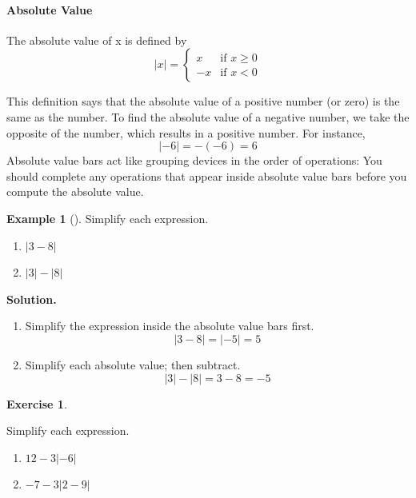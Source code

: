 \documentclass[10pt,]{book}
\theoremstyle{plain}
\theoremstyle{definition}
\newtheorem{exercise}[theorem]{Exercise}
\theoremstyle{definition}
\newtheorem{example}[theorem]{Example}
\numberwithin{equation}{section}
\newcommand\abs[1]{\left|#1\right|}
\newcommand{\lt}{ < }
\newcommand{\amp}{ & }
\begin{document}
\paragraph[Absolute Value]{Absolute Value}\label{paragraphs-23}

   The absolute value of x is defined by
   \begin{equation*}
    \abs{x} =
    \begin{cases}
    x \amp \text{if } x\ge 0\\
    -x  \amp \text{if } x\lt 0
    \end{cases}
    \end{equation*}
%
\par

    This definition says that the absolute value of a positive number (or zero) is the same as the number. To find the absolute value of a negative number, we take the opposite of the number, which results in a positive number. For instance,
    \begin{equation*}\abs{−6} = −(−6) = 6\end{equation*}
    Absolute value bars act like grouping devices in the order of operations: You should complete any operations that appear inside absolute value bars before you compute the absolute value.
%
\begin{example}[]\label{example-abs}
Simplify each expression.%
\leavevmode%
\begin{enumerate}[label=*\alph**]
\item\hypertarget{li-253}{}\(\abs{3 − 8}\)\item\hypertarget{li-254}{}\(\abs{3} − \abs{8}\)\end{enumerate}
\par\medskip\noindent%
\textbf{Solution.}\quad \leavevmode%
\begin{enumerate}[label=*\alph**]
\item\hypertarget{li-255}{}Simplify the expression inside the absolute value bars first.
            \begin{equation*}\abs{3 − 8} = \abs{−5} = 5\end{equation*}\item\hypertarget{li-256}{}Simplify each absolute value; then subtract.
            \begin{equation*}\abs{3} − \abs{8} = 3 − 8 = −5\end{equation*}\end{enumerate}
\end{example}
\begin{exercise}\label{exercise-abs}

    Simplify each expression.
    \leavevmode%
\begin{enumerate}[label=*\alph**]
\item\hypertarget{li-257}{}\(12 − 3\abs{−6}\)\item\hypertarget{li-258}{}\(−7 − 3\abs{2 − 9}\)\end{enumerate}
\end{exercise}
\typeout{************************************************}
\typeout{************************************************}
\end{document}
